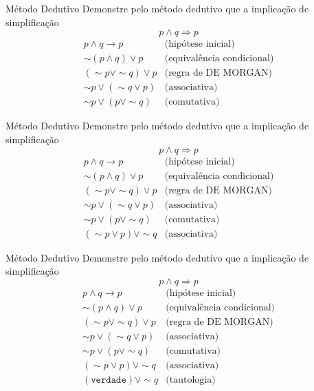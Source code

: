\begin{frame}[t]{Método Dedutivo}
	Demonstre pelo método dedutivo que a implicação de simplificação $$p \wedge q \Rightarrow p$$
	\vskip 0.2cm
	$$\begin{array}{cl}
	p \wedge q \rightarrow p & \mbox{(hipótese inicial)} \\
	\sim(p \wedge q) \vee p & \mbox{(equivalência condicional)} \\
	(\sim p \vee\sim q) \vee p & \mbox{(regra de DE MORGAN)} \\
	\sim p \vee (\sim q \vee p) & \mbox{(associativa)} \\
	\sim p \vee (p \vee\sim q) & \mbox{(comutativa)} 
	\end{array}$$
\end{frame}

\begin{frame}[t]{Método Dedutivo}
	Demonstre pelo método dedutivo que a implicação de simplificação $$p \wedge q \Rightarrow p$$
	\vskip 0.2cm
	$$\begin{array}{cl}
	p \wedge q \rightarrow p & \mbox{(hipótese inicial)} \\
	\sim(p \wedge q) \vee p & \mbox{(equivalência condicional)} \\
	(\sim p \vee\sim q) \vee p & \mbox{(regra de DE MORGAN)} \\
	\sim p \vee (\sim q \vee p) & \mbox{(associativa)} \\
	\sim p \vee (p \vee\sim q) & \mbox{(comutativa)} \\
	(\sim p \vee p) \vee\sim q & \mbox{(associativa)} 
	\end{array}$$
\end{frame}

\begin{frame}[t]{Método Dedutivo}
	Demonstre pelo método dedutivo que a implicação de simplificação $$p \wedge q \Rightarrow p$$
	\vskip 0.2cm
	$$\begin{array}{cl}
	p \wedge q \rightarrow p & \mbox{(hipótese inicial)} \\
	\sim(p \wedge q) \vee p & \mbox{(equivalência condicional)} \\
	(\sim p \vee\sim q) \vee p & \mbox{(regra de DE MORGAN)} \\
	\sim p \vee (\sim q \vee p) & \mbox{(associativa)} \\
	\sim p \vee (p \vee\sim q) & \mbox{(comutativa)} \\
	(\sim p \vee p) \vee\sim q & \mbox{(associativa)} \\
	(\mathtt{verdade}) \vee\sim q & \mbox{(tautologia)}
	\end{array}$$
\end{frame}

